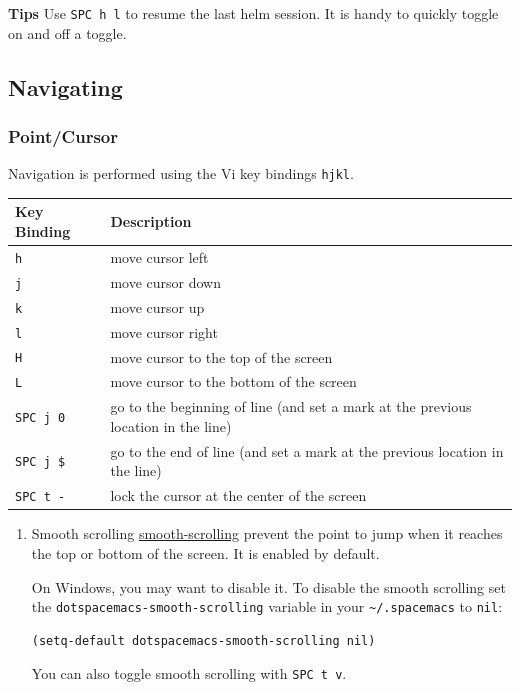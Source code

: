 \documentclass[11pt]{article}
\begin{document}
\textbf{Tips} Use \texttt{SPC h l} to resume the last helm session. It is handy to quickly
toggle on and off a toggle.

\subsection{Navigating}
\label{sec:org5eac294}
\subsubsection{Point/Cursor}
\label{sec:orga8012d1}
Navigation is performed using the Vi key bindings \texttt{hjkl}.

\begin{center}
\begin{tabular}{ll}
Key Binding & Description\\
\hline
\texttt{h} & move cursor left\\
\texttt{j} & move cursor down\\
\texttt{k} & move cursor up\\
\texttt{l} & move cursor right\\
\texttt{H} & move cursor to the top of the screen\\
\texttt{L} & move cursor to the bottom of the screen\\
\texttt{SPC j 0} & go to the beginning of line (and set a mark at the previous location in the line)\\
\texttt{SPC j \$} & go to the end of line (and set a mark at the previous location in the line)\\
\texttt{SPC t -} & lock the cursor at the center of the screen\\
\end{tabular}
\end{center}

\begin{enumerate}
\item Smooth scrolling
\label{sec:org3ed9fd4}
\href{https://github.com/aspiers/smooth-scrolling}{smooth-scrolling} prevent the point to jump when it reaches the top or
bottom of the screen. It is enabled by default.

On Windows, you may want to disable it. To disable the smooth scrolling set the
\texttt{dotspacemacs-smooth-scrolling} variable in your \texttt{\textasciitilde{}/.spacemacs} to \texttt{nil}:

\begin{verbatim}
(setq-default dotspacemacs-smooth-scrolling nil)
\end{verbatim}

You can also toggle smooth scrolling with \texttt{SPC t v}.
\end{enumerate}
\end{document}

